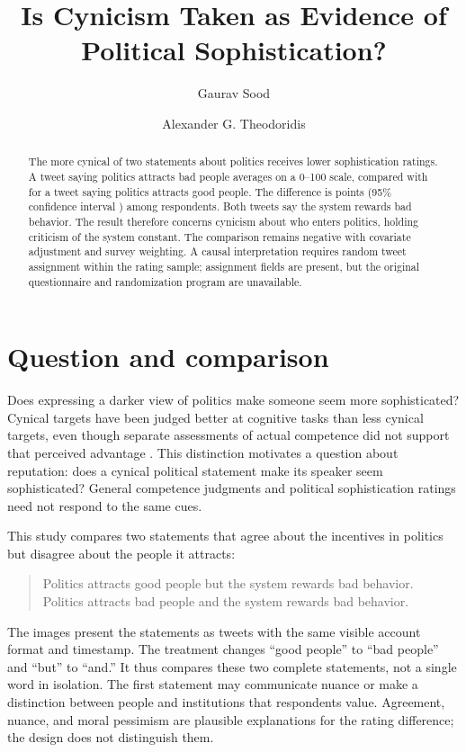 \documentclass[11pt]{article}
\title{Is Cynicism Taken as Evidence of\\Political Sophistication?}
\author{Gaurav Sood \and Alexander G. Theodoridis}
\date{}
\begin{document}
\maketitle
\begin{abstract}
The more cynical of two statements about politics receives lower sophistication
ratings. A tweet saying politics attracts bad people averages \BadMean{} on a
0--100 scale, compared with \GoodMean{} for a tweet saying politics attracts good
people. The difference is \MainEstimate{} points (95\% confidence interval
\MainCI{}) among \RatingN{} respondents. Both tweets say the system rewards bad
behavior. The result therefore concerns cynicism about who enters politics,
holding criticism of the system constant. The comparison remains negative with
covariate adjustment and survey weighting. A causal interpretation requires
random tweet assignment within the rating sample; assignment fields are present,
but the original questionnaire and randomization program are unavailable.
\end{abstract}

\section{Question and comparison}

Does expressing a darker view of politics make someone seem more sophisticated?
Cynical targets have been judged better at cognitive tasks than less cynical
targets, even though separate assessments of actual competence did not support
that perceived advantage \citep{stavrova2019}. This distinction motivates a
question about reputation: does a cynical political statement make its speaker
seem sophisticated? General competence judgments and political sophistication
ratings need not respond to the same cues.

This study compares two statements that agree about the incentives in politics
but disagree about the people it attracts:
\begin{quote}
Politics attracts good people but the system rewards bad behavior.\\[6pt]
Politics attracts bad people and the system rewards bad behavior.
\end{quote}
The images present the statements as tweets with the same visible account
format and timestamp. The treatment changes ``good people'' to ``bad people''
and ``but'' to ``and.'' It thus compares these two complete statements, not a
single word in isolation. The first statement may communicate nuance or make
a distinction between people and institutions that respondents value. Agreement,
nuance, and moral pessimism are plausible explanations for the rating difference;
the design does not distinguish them.
\end{document}
